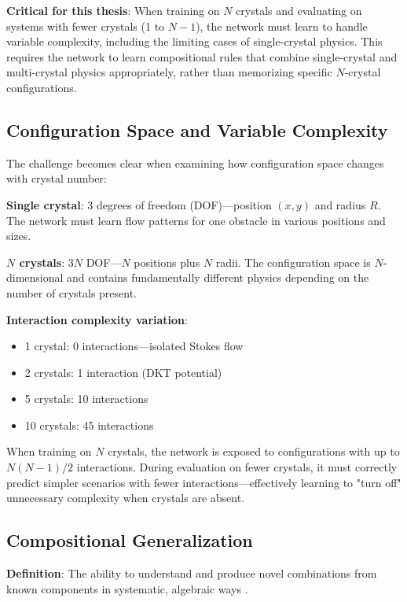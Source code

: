 \textbf{Critical for this thesis}: When training on $N$ crystals and evaluating on systems with fewer crystals (1 to $N-1$), the network must learn to handle variable complexity, including the limiting cases of single-crystal physics. This requires the network to learn compositional rules that combine single-crystal and multi-crystal physics appropriately, rather than memorizing specific $N$-crystal configurations.

\subsection{Configuration Space and Variable Complexity}

The challenge becomes clear when examining how configuration space changes with crystal number:

\textbf{Single crystal}: 3 degrees of freedom (DOF)---position $(x, y)$ and radius $R$. The network must learn flow patterns for one obstacle in various positions and sizes.

\textbf{$N$ crystals}: $3N$ DOF---$N$ positions plus $N$ radii. The configuration space is $N$-dimensional and contains fundamentally different physics depending on the number of crystals present.

\textbf{Interaction complexity variation}:
\begin{itemize}
    \item 1 crystal: 0 interactions---isolated Stokes flow
    \item 2 crystals: 1 interaction (DKT potential)
    \item 5 crystals: 10 interactions
    \item 10 crystals: 45 interactions
\end{itemize}

When training on $N$ crystals, the network is exposed to configurations with up to $N(N-1)/2$ interactions. During evaluation on fewer crystals, it must correctly predict simpler scenarios with fewer interactions---effectively learning to "turn off" unnecessary complexity when crystals are absent.

\subsection{Compositional Generalization}

\textbf{Definition}: The ability to understand and produce novel combinations from known components in systematic, algebraic ways \cite{lake2023systematic}.

